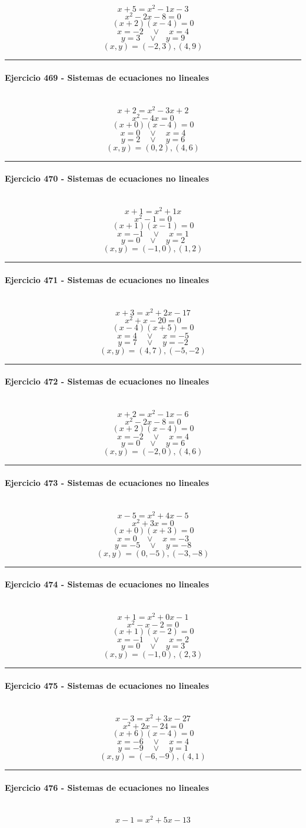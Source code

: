 \documentclass[10pt,a4paper]{article}
\newcommand{\res}[1]{\paragraph{#1}\mbox{}\\[-1.2em]}
\begin{document}
\[ x+5=x^2-1x-3 \]
\[ x^{2} - 2 x - 8=0 \]
\[ (x+2)(x-4)=0 \]
\[ x=-2\quad \vee \quad x=4 \]
\[ y=3\quad \vee \quad y=9 \]
\[ \boxed{(x,y)=(-2,3),(4,9)} \]
\vspace{1mm}\hrule\vspace{2mm}
\res{Ejercicio 469 - Sistemas de ecuaciones no lineales}
\[ x+2=x^2-3x+2 \]
\[ x^{2} - 4 x=0 \]
\[ (x+0)(x-4)=0 \]
\[ x=0\quad \vee \quad x=4 \]
\[ y=2\quad \vee \quad y=6 \]
\[ \boxed{(x,y)=(0,2),(4,6)} \]
\vspace{1mm}\hrule\vspace{2mm}
\res{Ejercicio 470 - Sistemas de ecuaciones no lineales}
\[ x+1=x^2+1x \]
\[ x^{2} - 1=0 \]
\[ (x+1)(x-1)=0 \]
\[ x=-1\quad \vee \quad x=1 \]
\[ y=0\quad \vee \quad y=2 \]
\[ \boxed{(x,y)=(-1,0),(1,2)} \]
\vspace{1mm}\hrule\vspace{2mm}
\res{Ejercicio 471 - Sistemas de ecuaciones no lineales}
\[ x+3=x^2+2x-17 \]
\[ x^{2} + x - 20=0 \]
\[ (x-4)(x+5)=0 \]
\[ x=4\quad \vee \quad x=-5 \]
\[ y=7\quad \vee \quad y=-2 \]
\[ \boxed{(x,y)=(4,7),(-5,-2)} \]
\vspace{1mm}\hrule\vspace{2mm}
\res{Ejercicio 472 - Sistemas de ecuaciones no lineales}
\[ x+2=x^2-1x-6 \]
\[ x^{2} - 2 x - 8=0 \]
\[ (x+2)(x-4)=0 \]
\[ x=-2\quad \vee \quad x=4 \]
\[ y=0\quad \vee \quad y=6 \]
\[ \boxed{(x,y)=(-2,0),(4,6)} \]
\vspace{1mm}\hrule\vspace{2mm}
\res{Ejercicio 473 - Sistemas de ecuaciones no lineales}
\[ x-5=x^2+4x-5 \]
\[ x^{2} + 3 x=0 \]
\[ (x+0)(x+3)=0 \]
\[ x=0\quad \vee \quad x=-3 \]
\[ y=-5\quad \vee \quad y=-8 \]
\[ \boxed{(x,y)=(0,-5),(-3,-8)} \]
\vspace{1mm}\hrule\vspace{2mm}
\res{Ejercicio 474 - Sistemas de ecuaciones no lineales}
\[ x+1=x^2+0x-1 \]
\[ x^{2} - x - 2=0 \]
\[ (x+1)(x-2)=0 \]
\[ x=-1\quad \vee \quad x=2 \]
\[ y=0\quad \vee \quad y=3 \]
\[ \boxed{(x,y)=(-1,0),(2,3)} \]
\vspace{1mm}\hrule\vspace{2mm}
\res{Ejercicio 475 - Sistemas de ecuaciones no lineales}
\[ x-3=x^2+3x-27 \]
\[ x^{2} + 2 x - 24=0 \]
\[ (x+6)(x-4)=0 \]
\[ x=-6\quad \vee \quad x=4 \]
\[ y=-9\quad \vee \quad y=1 \]
\[ \boxed{(x,y)=(-6,-9),(4,1)} \]
\vspace{1mm}\hrule\vspace{2mm}
\res{Ejercicio 476 - Sistemas de ecuaciones no lineales}
\[ x-1=x^2+5x-13 \]
\end{document}
